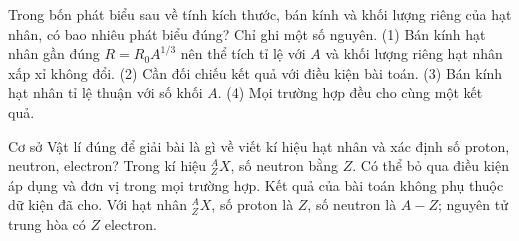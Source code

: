 \begin{ex}
Trong bốn phát biểu sau về tính kích thước, bán kính và khối lượng riêng của hạt nhân, có bao nhiêu phát biểu đúng? Chỉ ghi một số nguyên. (1) Bán kính hạt nhân gần đúng $R=R_0A^{1/3}$ nên thể tích tỉ lệ với $A$ và khối lượng riêng hạt nhân xấp xỉ không đổi. (2) Cần đối chiếu kết quả với điều kiện bài toán. (3) Bán kính hạt nhân tỉ lệ thuận với số khối $A$. (4) Mọi trường hợp đều cho cùng một kết quả.
\end{ex}

\begin{ex}
Cơ sở Vật lí đúng để giải bài là gì về viết kí hiệu hạt nhân và xác định số proton, neutron, electron?
\choice
{Trong kí hiệu $^{A}_{Z}X$, số neutron bằng $Z$.}
{Có thể bỏ qua điều kiện áp dụng và đơn vị trong mọi trường hợp.}
{Kết quả của bài toán không phụ thuộc dữ kiện đã cho.}
{\True Với hạt nhân $^{A}_{Z}X$, số proton là $Z$, số neutron là $A-Z$; nguyên tử trung hòa có $Z$ electron.}
\end{ex}

